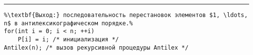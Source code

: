 \vspace{5pt} \hrule
\begin{lstlisting}[caption={Генерация перестановок в антилексикографическом порядке}, label=p186_2, escapechar=\%]
%\noindent\textbf{Вход:} n - количество элементов.\\%
%\textbf{Выход:} последовательность перестановок элементов $1, \ldots, n$ в антилексикографическом порядке.%
for(int i = 0; i < n; ++i)
	P[i] = i; /* инициализация */
Antilex(n); /* вызов рекурсивной процедуры Antilex */
\end{lstlisting}
